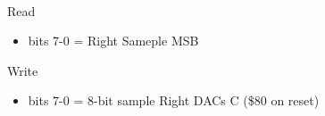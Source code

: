 \\
Read
\begin{itemize}
\item bits 7-0 = \iis Right Sameple MSB
\end{itemize}
Write
\begin{itemize}
\item bits 7-0 = 8-bit sample Right DACs C (\$80 on reset)
\end{itemize}

